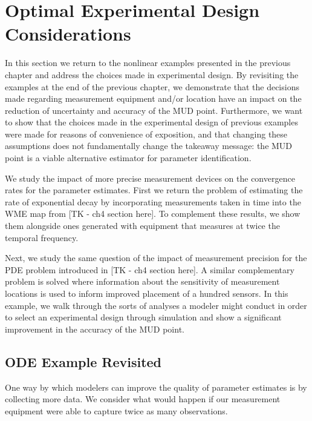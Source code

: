 \section{Optimal Experimental Design Considerations}

In this section we return to the nonlinear examples presented in the previous chapter and address the choices made in experimental design.
By revisiting the examples at the end of the previous chapter, we demonstrate that the decisions made regarding measurement equipment and/or location have an impact on the reduction of uncertainty and accuracy of the MUD point.
Furthermore, we want to show that the choices made in the experimental design of previous examples were made for reasons of convenience of exposition, and that changing these assumptions does not fundamentally change the takeaway message: the MUD point is a viable alternative estimator for parameter identification.

We study the impact of more precise measurement devices on the convergence rates for the parameter estimates.
First we return the problem of estimating the rate of exponential decay by incorporating measurements taken in time into the WME map from [TK - ch4 section here].
To complement these results, we show them alongside ones generated with equipment that measures at twice the temporal frequency.

Next, we study the same question of the impact of measurement precision for the PDE problem introduced in [TK - ch4 section here].
A similar complementary problem is solved where information about the sensitivity of measurement locations is used to inform improved placement of a hundred sensors.
In this example, we walk through the sorts of analyses a modeler might conduct in order to select an experimental design through simulation and show a significant improvement in the accuracy of the MUD point.


\subsection{ODE Example Revisited}
One way by which modelers can improve the quality of parameter estimates is by collecting more data.
We consider what would happen if our measurement equipment were able to capture twice as many observations.

